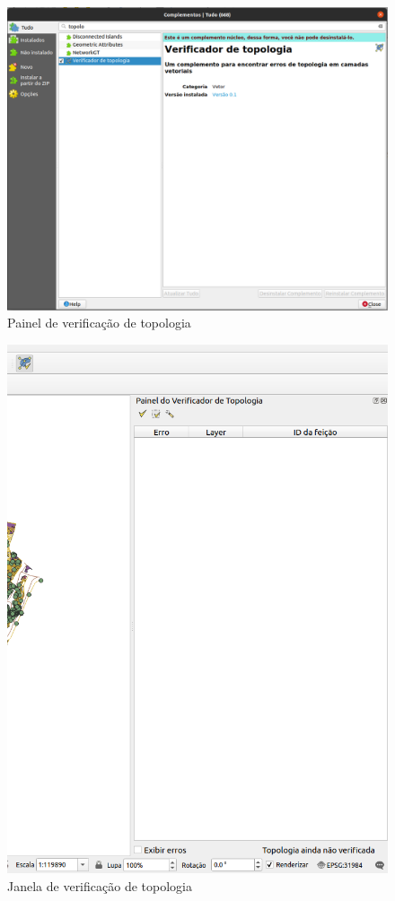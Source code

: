 \documentclass[
  portuguese,
]{krantz}
\begin{document}
\begin{figure}
\centering
\includegraphics{media/modulo8/fig89_a.png}
\caption{Painel de verificação de topologia}
\end{figure}

\begin{figure}
\centering
\includegraphics{media/modulo8/fig89_b.png}
\caption{Janela de verificação de topologia}
\end{figure}
\end{document}
